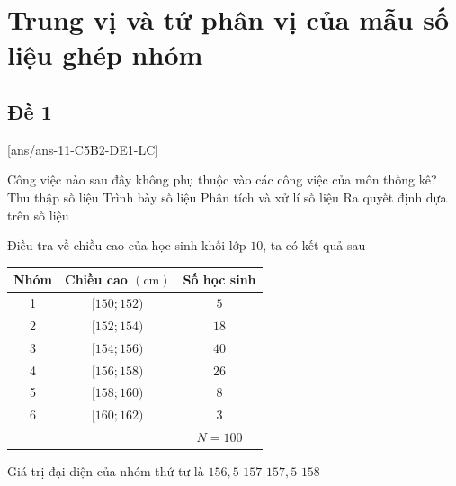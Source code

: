 \section{Trung vị và tứ phân vị của mẫu số liệu ghép nhóm}

\subsection{Đề 1}
[ans/ans-11-C5B2-DE1-LC]
\caulc
\begin{ex}%
	Công việc nào sau đây không phụ thuộc vào các công việc của môn thống kê?
	\choice
	{Thu thập số liệu}
	{Trình bày số liệu}
	{Phân tích và xử lí số liệu}
	{\True Ra quyết định dựa trên số liệu}
\end{ex}

\begin{ex}%
	Điều tra về chiều cao của học sinh khối lớp $10$, ta có kết quả sau
	\begin{center}
		\begin{tabular}{|c|c|c|}
			\hline Nhóm & Chiều cao $(\mathrm{cm})$ & Số học sinh \\
			\hline 1 & {$[150 ; 152)$} & $5$ \\
			\hline 2 & {$[152 ; 154)$} & $18$ \\
			\hline 3 & {$[154 ; 156)$} & $40$ \\
			\hline 4 & {$[156 ; 158)$} & $26$ \\
			\hline 5 & {$[158 ; 160)$} & $8$ \\
			\hline 6 & {$[160 ; 162)$} & $3$ \\
			\hline \multicolumn{2}{|r|}{} & $N=100$ \\
			\hline
		\end{tabular}
	\end{center}
	Giá trị đại diện của nhóm thứ tư là
	\choice
	{$156{,}5$}
	{\True $157$}
	{$157{,}5$}
	{$158$}
\end{ex}

